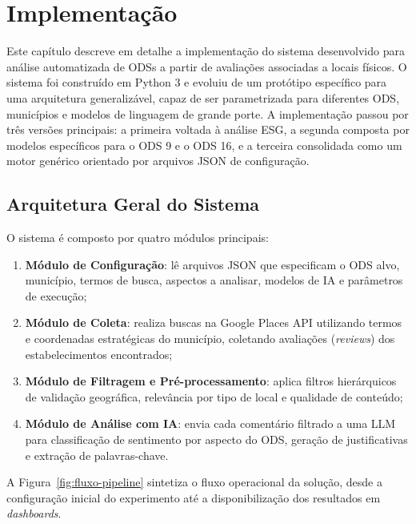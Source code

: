 \chapter{Implementação}
\label{cap:implementacao}

Este capítulo descreve em detalhe a implementação do sistema desenvolvido para análise automatizada de \glspl{ODS} a partir de avaliações associadas a locais físicos. O sistema foi construído em Python 3 e evoluiu de um protótipo específico para uma arquitetura generalizável, capaz de ser parametrizada para diferentes ODS, municípios e modelos de linguagem de grande porte. A implementação passou por três versões principais: a primeira voltada à análise ESG, a segunda composta por modelos específicos para o ODS 9 e o ODS 16, e a terceira consolidada como um motor genérico orientado por arquivos JSON de configuração.

\section{Arquitetura Geral do Sistema}
\label{sec:arq-geral}

O sistema é composto por quatro módulos principais:

\begin{enumerate}
    \item \textbf{Módulo de Configuração}: lê arquivos JSON que especificam o ODS alvo, município, termos de busca, aspectos a analisar, modelos de IA e parâmetros de execução;
    \item \textbf{Módulo de Coleta}: realiza buscas na Google Places API utilizando termos e coordenadas estratégicas do município, coletando avaliações (\textit{reviews}) dos estabelecimentos encontrados;
    \item \textbf{Módulo de Filtragem e Pré-processamento}: aplica filtros hierárquicos de validação geográfica, relevância por tipo de local e qualidade de conteúdo;
    \item \textbf{Módulo de Análise com IA}: envia cada comentário filtrado a uma LLM para classificação de sentimento por aspecto do ODS, geração de justificativas e extração de palavras-chave.
\end{enumerate}

\clearpage

A Figura~\ref{fig:fluxo-pipeline} sintetiza o fluxo operacional da solução, desde a configuração inicial do experimento até a disponibilização dos resultados em \textit{dashboards}.

